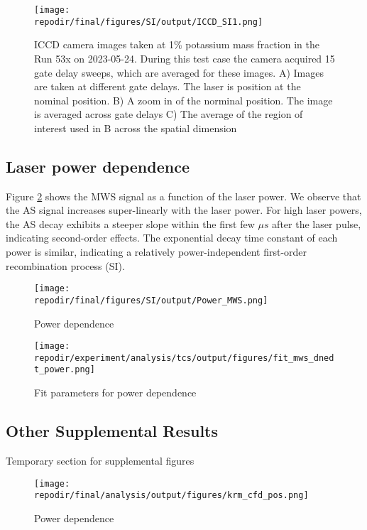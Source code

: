 \begin{figure}[]
\centering
\texttt{[image: \\repodir/final/figures/SI/output/ICCD\_SI1.png]}
\caption{ICCD camera images taken at 1\% potassium mass fraction in the Run 53x on 2023-05-24. During this test case the camera acquired 15 gate delay sweeps, which are averaged for these images. A) Images are taken at different gate delays. The laser is position at the nominal position. B) A zoom in of the norminal position. The image is averaged across gate delays C) The average of the region of interest used in B across the spatial dimension}
\label{fig:SI_536_iccd}
\end{figure}


\subsection{Laser power dependence}

Figure \ref{fig:SI_power_dependence} shows the MWS signal as a function of the laser power. We observe that the AS signal increases super-linearly with the laser power. For high laser powers, the AS decay exhibits a steeper slope within the first few $\mu s$ after the laser pulse, indicating second-order effects. The exponential decay time constant of each power is similar, indicating a relatively power-independent first-order recombination process (SI).

\begin{figure}[h]
    \texttt{[image: \\repodir/final/figures/SI/output/Power\_MWS.png]} 
    \caption{Power dependence}
    \label{fig:SI_power_dependence}
\end{figure}

\begin{figure}[h]
    \texttt{[image: \\repodir/experiment/analysis/tcs/output/figures/fit\_mws\_dnedt\_power.png]} 
    \caption{Fit parameters for power dependence}
    \label{fig:SI_power_dependence_fit}
\end{figure}

\subsection{Other Supplemental Results}

Temporary section for supplemental figures


\begin{figure}[h]
    \texttt{[image: \\repodir/final/analysis/output/figures/krm\_cfd\_pos.png]} 
    \caption{Power dependence}
    \label{fig:SI_krm_cfd_pos.png}
\end{figure}